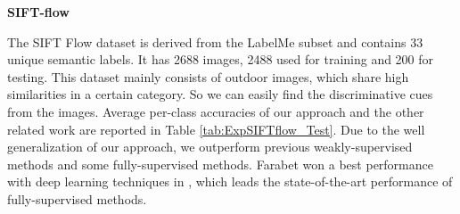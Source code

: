\textbf{SIFT-flow}

The SIFT Flow dataset\cite{liu2011nonparametric} is derived from the LabelMe subset and contains 33 unique semantic labels. It has 2688 images, 2488 used for training and 200 for testing. This dataset mainly consists of outdoor images, which share high similarities in a certain category. So we can easily find the discriminative cues from the images. Average per-class accuracies of our approach and the other related work are reported in Table \ref{tab:ExpSIFTflow_Test}. Due to the well generalization of our approach, we outperform previous weakly-supervised methods and some fully-supervised methods. Farabet won a best performance with deep learning techniques in \cite{farabet2013learning}, which leads the state-of-the-art performance of fully-supervised methods.
